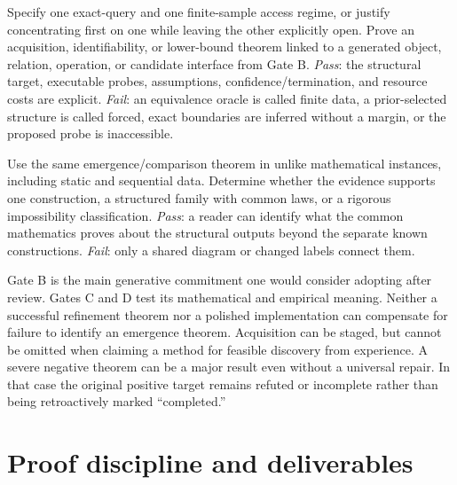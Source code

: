 \documentclass[11pt]{article}
\theoremstyle{remark}
\begin{document}
\begin{description}[style=nextline,leftmargin=0pt]
\item[Gate D \quad Relate emergence to feasible observation]
Specify one exact-query and one finite-sample access regime, or justify concentrating first on one while leaving the other explicitly open. Prove an acquisition, identifiability, or lower-bound theorem linked to a generated object, relation, operation, or candidate interface from Gate B. \emph{Pass}: the structural target, executable probes, assumptions, confidence/termination, and resource costs are explicit. \emph{Fail}: an equivalence oracle is called finite data, a prior-selected structure is called forced, exact boundaries are inferred without a margin, or the proposed probe is inaccessible.

\item[Gate E \quad Test transfer and synthesize]
Use the same emergence/comparison theorem in unlike mathematical instances, including static and sequential data. Determine whether the evidence supports one construction, a structured family with common laws, or a rigorous impossibility classification. \emph{Pass}: a reader can identify what the common mathematics proves about the structural outputs beyond the separate known constructions. \emph{Fail}: only a shared diagram or changed labels connect them.
\end{description}

Gate B is the main generative commitment one would consider adopting after review. Gates C and D test its mathematical and empirical meaning. Neither a successful refinement theorem nor a polished implementation can compensate for failure to identify an emergence theorem. Acquisition can be staged, but cannot be omitted when claiming a method for feasible discovery from experience. A severe negative theorem can be a major result even without a universal repair. In that case the original positive target remains refuted or incomplete rather than being retroactively marked ``completed.''

\section{Proof discipline and deliverables}
\label{sec:discipline}
\end{document}
